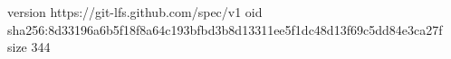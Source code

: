 version https://git-lfs.github.com/spec/v1
oid sha256:8d33196a6b5f18f8a64c193bfbd3b8d13311ee5f1dc48d13f69c5dd84e3ca27f
size 344
